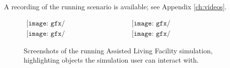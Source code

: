 A recording of the running scenario is available; see Appendix \ref{ch:videos}.\\


\begin{figure}[h]
	\begin{center}
		$
			\begin{array}{cc}
				\texttt{[image: gfx/Chapter\_EvaluationScenarios/bedroom]}&
				\texttt{[image: gfx/Chapter\_EvaluationScenarios/bathroom]}
			\end{array}
		$
		$
			\begin{array}{cc}
				\texttt{[image: gfx/Chapter\_EvaluationScenarios/living]}&
				\texttt{[image: gfx/Chapter\_EvaluationScenarios/kitchen]}
			\end{array}
		$
	\end{center}
	\caption{Screenshots of the running Assisted Living Facility simulation, highlighting objects the simulation user can interact with.}
	\label{fig:eval_alf_interactive}
\end{figure}

